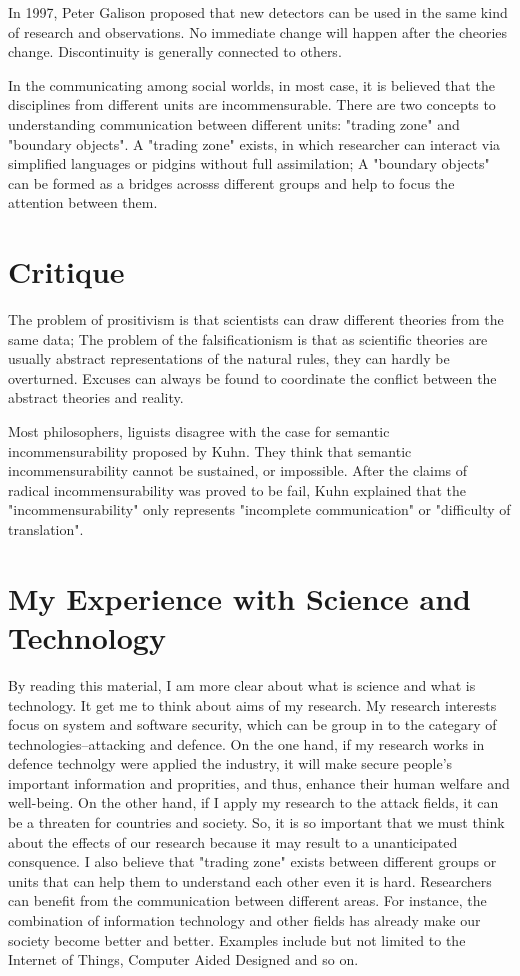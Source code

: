 \documentclass[18pt]{article}
\begin{document}
In 1997, Peter Galison proposed that new detectors can be used in the same kind of research and observations.
No immediate change will happen after the cheories change. Discontinuity is generally connected to others.

In the communicating among social worlds, in most case, it is believed that the disciplines from different units
are incommensurable. There are two concepts to understanding communication between different units:
"trading zone" and "boundary objects". A "trading zone" exists, in which researcher can interact via simplified languages or 
pidgins without full assimilation; A "boundary objects" can be formed as a bridges acrosss different groups
and help to focus the attention between them.
\section{Critique}
The problem of prositivism is that scientists can draw different theories from the same data;
The problem of the falsificationism is that 
as scientific theories are usually abstract representations of the natural rules, 
they can hardly be overturned. Excuses can always be found to coordinate the conflict between the
abstract theories and reality.

Most philosophers, liguists disagree with the case for semantic incommensurability proposed by Kuhn.
They think that semantic incommensurability cannot be sustained, or impossible.
After the claims of radical incommensurability was proved to be fail, Kuhn explained that the "incommensurability" 
only represents "incomplete communication" or "difficulty of translation".

\section{My Experience with Science and Technology}
By reading this material, I am more clear about what is science and what is technology.
It get me to think about aims of my research. 
My research interests focus on system and software security, which can be group in to the categary of technologies--attacking and defence. 
On the one hand, if my research works in defence technolgy were applied the industry, it will make secure
people's important information and proprities, and thus, enhance their human welfare and well-being.
On the other hand, if I apply my research to the attack fields, it can be a threaten for countries and society.
So, it is so important that we must think about the effects of our research because it may result to a unanticipated consquence.
I also believe that "trading zone" exists between different groups or units that can help them to understand each other even it is hard.
Researchers can benefit from the communication between different areas.
For instance, the combination of information technology and other fields has already make
our society become better and better. Examples include but not limited to the Internet of Things, Computer Aided Designed and so on.   


\end{document}
